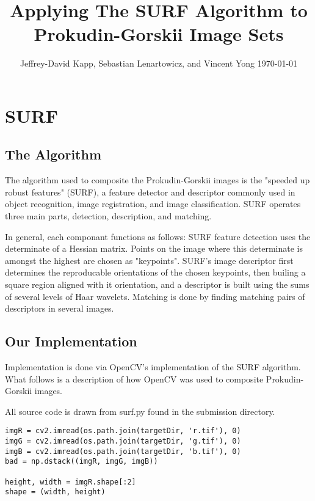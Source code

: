 \documentclass[10pt]{IEEEtran}
\title{Applying The SURF Algorithm to Prokudin-Gorskii Image Sets}
\author{Jeffrey-David Kapp, Sebastian Lenartowicz, and Vincent Yong
\linebreak
\today}
\begin{document}
\maketitle



\section{SURF}

\subsection{The Algorithm}

The algorithm used to composite the Prokudin-Gorskii images is the "speeded up robust features" (SURF), a feature detector and descriptor commonly used in object recognition, image registration, and image classification. SURF operates three main parts, detection, description, and matching.
\linebreak

In general, each componant functions as follows: SURF feature detection uses the determinate of a Hessian matrix. Points on the image where this determinate is amongst the highest are chosen as "keypoints". SURF's image descriptor first determines the reproducable orientations of the chosen keypoints, then builing a square region aligned with it orientation, and a descriptor is built using the sums of several levels of Haar wavelets. Matching is done by finding matching pairs of descriptors in several images. 

\subsection{Our Implementation}

Implementation is done via OpenCV's implementation of the SURF algorithm. What follows is a description of how OpenCV was used to composite Prokudin-Gorskii images.

All source code is drawn from surf.py found in the submission directory. 

\begin{lstlisting}
imgR = cv2.imread(os.path.join(targetDir, 'r.tif'), 0)
imgG = cv2.imread(os.path.join(targetDir, 'g.tif'), 0)
imgB = cv2.imread(os.path.join(targetDir, 'b.tif'), 0)
bad = np.dstack((imgR, imgG, imgB))

height, width = imgR.shape[:2]
shape = (width, height)
\end{lstlisting}
\end{document}
